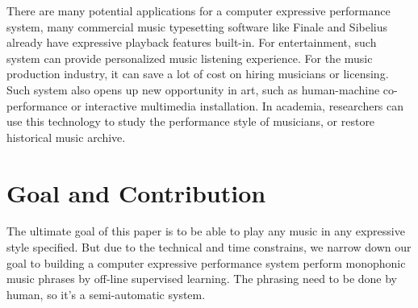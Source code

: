 
There are many potential applications for a computer expressive performance system, many commercial music typesetting software like Finale and Sibelius already have expressive playback features built-in. For entertainment, such system can provide personalized music listening experience. For the music production industry, it can save a lot of cost on hiring musicians or licensing. Such system also opens up new opportunity in art, such as human-machine co-performance or interactive multimedia installation. In academia, researchers can use this technology to study the performance style of musicians, or restore historical music archive.


%



\section{Goal and Contribution}
The ultimate goal of this paper is to be able to play any music in any expressive style specified. But due to the technical and time constrains, we narrow down our goal to building a computer expressive performance system perform monophonic music phrases by off-line supervised learning. The phrasing need to be done by human, so it's a semi-automatic system.


